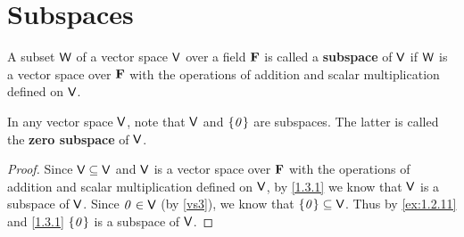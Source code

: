 \section{Subspaces}\label{sec:1.3}

\begin{defn}\label{1.3.1}
  A subset \(\mathsf{W}\) of a vector space \(\mathsf{V}\) over a field \(\mathbf{F}\) is called a \textbf{subspace} of \(\mathsf{V}\) if \(\mathsf{W}\) is a vector space over \(\mathbf{F}\) with the operations of addition and scalar multiplication defined on \(\mathsf{V}\).
\end{defn}

\begin{eg}\label{1.3.2}
  In any vector space \(\mathsf{V}\), note that \(\mathsf{V}\) and \(\left\lbrace\mathit{0}\right\rbrace\) are subspaces.
  The latter is called the \textbf{zero subspace} of \(\mathsf{V}\).
\end{eg}

\begin{proof}
  Since \(\mathsf{V} \subseteq \mathsf{V}\) and \(\mathsf{V}\) is a vector space over \(\mathbf{F}\) with the operations of addition and scalar multiplication defined on \(\mathsf{V}\), by \cref{1.3.1} we know that \(\mathsf{V}\) is a subspace of \(\mathsf{V}\).
  Since \(\mathit{0} \in \mathsf{V}\) (by \ref{vs3}), we know that \(\left\lbrace\mathit{0}\right\rbrace \subseteq \mathsf{V}\).
  Thus by \cref{ex:1.2.11} and \cref{1.3.1} \(\left\lbrace\mathit{0}\right\rbrace\) is a subspace of \(\mathsf{V}\).
\end{proof}